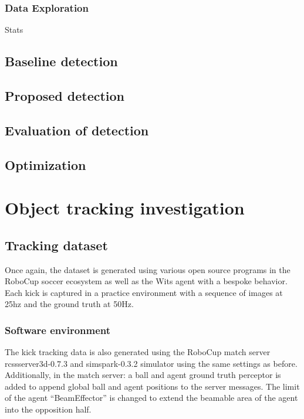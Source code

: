 \documentclass[a4paper,twoside,12pt]{report}
\begin{document}
\subsection{Data Exploration}
Stats

\section{Baseline detection}

\section{Proposed detection}

\section{Evaluation of detection}

\section{Optimization}

\chapter{Object tracking investigation}

\section{Tracking dataset}
Once again, the dataset is generated using various open source programs in the RoboCup soccer ecosystem as well as the Wits agent with a bespoke behavior. Each kick is captured in a practice environment with a sequence of images at 25hz and the ground truth at 50Hz.

\subsection{Software environment}
The kick tracking data is also generated using the RoboCup match server rcssserver3d-0.7.3 and simspark-0.3.2 simulator using the same settings as before. Additionally, in the match server: a ball and agent ground truth perceptor is added to append global ball and agent positions to the server messages. The limit of the agent ``BeamEffector'' is changed to extend the beamable area of the agent into the opposition half.
\end{document}
